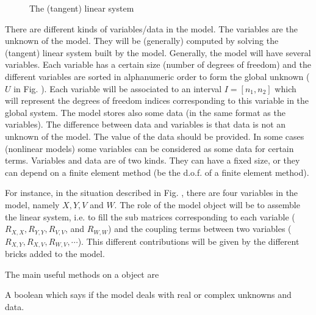 \documentclass[a4paper,11pt,english]{sphinxmanual}
\begin{document}
\begin{figure}[htbp]
\centering
\capstart

\noindent{}
\caption{The (tangent) linear system}\label{\detokenize{userdoc/model_object:id1}}\label{\detokenize{userdoc/model_object:ud-fig-syslin}}\end{figure}

There are different kinds of variables/data in the model. The variables are the
unknown of the model. They will be (generally) computed by solving the (tangent)
linear system built by the model. Generally, the model will have several
variables. Each variable has a certain size (number of degrees of freedom) and the
different variables are sorted in alphanumeric order to form the global unknown
(\(U\) in Fig. {\hyperref[\detokenize{userdoc/model_object:ud-fig-syslin}]{}}). Each variable will be associated to an
interval \(I = [n_1, n_2]\) which will represent the degrees of freedom
indices corresponding to this variable in the global system. The model stores also
some data (in the same format as the variables). The difference between data
and variables is that data is not an unknown of the model. The value of the
data should be provided. In some cases (nonlinear models) some variables can be
considered as some data for certain terms. Variables and data are of two kinds.
They can have a fixed size, or they can depend on a finite element method (be the
d.o.f. of a finite element method).

For instance, in the situation described in Fig. {\hyperref[\detokenize{userdoc/model_object:ud-fig-syslin}]{}}, there are four variables in the model, namely \(X, Y, V\) and \(W\). The role of
the model object will be to assemble the linear system, i.e. to fill the sub
matrices corresponding to each variable (\(R_{X,X}, R_{Y,Y}, R_{V,V}\), and
\(R_{W,W}\)) and the coupling terms between two variables (\(R_{X,Y},
R_{X,V}, R_{W,V}, \cdots\)). This different contributions will be given by the
different bricks added to the model.

The main useful methods on a  object are

\begin{fulllineitems}
\label{\detokenize{userdoc/model_object:_CPPv4N6getfem5model10is_complexEv}}%
\pysigstartmultiline
{}%
\pysigstopmultiline
A boolean which says if the model deals with real or complex unknowns and data.

\end{fulllineitems}
\end{document}
